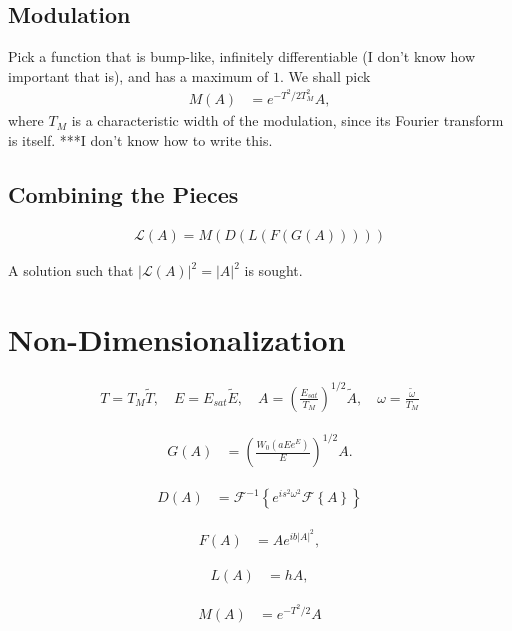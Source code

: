 \documentclass[12pt]{article}
\newcommand{\Es}{E_{sat}}
\newcommand{\FT}[1]{\mathcal{F}\left\{ #1 \right\}}
\newcommand{\FTi}[1]{\mathcal{F}^{-1}\left\{ #1 \right\}}
\begin{document}
\subsection{Modulation}
Pick a function that is bump-like, infinitely differentiable (I don't know how important that is), and has a maximum of $1$. We shall pick
\begin{align*}
M(A) &= e^{-T^2 / 2 T_M^2} A,
\end{align*}
where $T_M$ is a characteristic width of the modulation, since its Fourier transform is itself. ***I don't know how to write this.

\subsection{Combining the Pieces}

\begin{align*}
\mathcal{L}(A) = M(D(L(F(G(A)))))
\end{align*}

A solution such that $|\mathcal{L}(A)|^2 = |A|^2$ is sought.

\section{Non-Dimensionalization}

\begin{align*}
T = T_M \widetilde{T}, \quad E = \Es \widetilde{E}, \quad A = \left( \frac{\Es}{T_M} \right)^{1/2} \widetilde{A}, \quad \omega = \frac{\widetilde{\omega}}{T_M}
\end{align*}

\begin{align*}
G(A) &= \left( \frac{W_0 \left( a E e^{E}\right)}{E} \right)^{1/2} A.
\end{align*}

\begin{align*}
D(A) &= \FTi{e^{i s^2 \omega^2} \FT{A}}
\end{align*}

\begin{align*}
F(A) &= A e^{i b |A|^2},
\end{align*}

\begin{align*}
L(A) &= h A,
\end{align*}

\begin{align*}
M(A) &= e^{-T^2 / 2} A
\end{align*}
\end{document}
